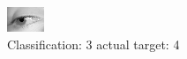 \begin{figure}[h!]
\begin{center}
\includegraphics[width=0.60\columnwidth]{figures/ID3007_class_3_target_4.png}
\end{center}
\caption{ Classification: 3 actual target: 4}
\label{fig:ID3007_class_3_target_4}
\end{figure}
